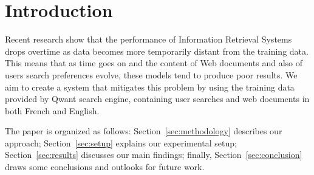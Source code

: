 \section{Introduction}
\label{sec:introduction}

Recent research show that the performance of Information Retrieval Systems drops overtime as data becomes more temporarily distant from the training data. This means that as time goes on and the content of Web documents and also of users search preferences evolve, these models tend to produce poor results.
We aim to create a system that mitigates this problem by using the training data provided by Qwant search engine, containing user searches and web documents in both French and English.

The paper is organized as follows: Section~\ref{sec:methodology} describes our approach; Section~\ref{sec:setup} explains our experimental setup; Section~\ref{sec:results} discusses our main findings; finally, Section~\ref{sec:conclusion} draws some conclusions and outlooks for future work.